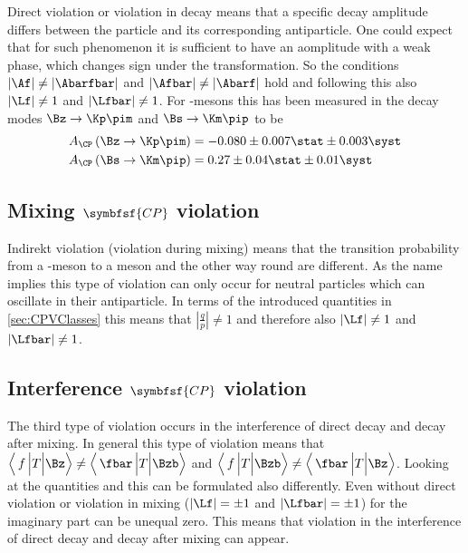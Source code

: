 Direct \CP violation or \CP violation in decay means that a specific decay amplitude differs between the particle and  its
corresponding antiparticle. One could expect that for such phenomenon it is sufficient to have an aomplitude with a weak phase,
which changes sign under the \CP transformation. So the conditions $\left|\Af\right|\neq\left|\Abarfbar\right|$ and
$\left|\Afbar\right|\neq\left|\Abarf\right|$ hold and following this also $\left|\Lf\right|\neq1$ and $\left|\Lfbar\right|\neq1$.
For \B-mesons this has been measured in the decay modes $\Bz\to\Kp\pim$ and $\Bs\to\Km\pip$ \cite{LHCb-PAPER-2013-018} to be
\begin{equation}
\begin{split}
A_{\CP}\left(\Bz\to\Kp\pim\right) &= -0.080\pm0.007\stat \pm 0.003\syst\\
A_{\CP}\left(\Bs\to\Km\pip\right) &= 0.27\pm0.04\stat \pm 0.01\syst
\end{split}
\end{equation}


\subsection[head={Mixing \CP violation},tocentry={Mixing \CP violation}]{Mixing $\symbfsf{C{}P}$ violation}
\label{sec:MixingCPV}

Indirekt \CP violation (\CP violation during mixing) means that the transition probability from a \Bz-meson to a \Bzb meson
and the other way round are different. As the name implies this type of \CP violation can only occur for neutral particles
which can oscillate in their antiparticle. In terms of the introduced quantities in \cref{sec:CPVClasses} this means that
$\left|\frac{q}{p}\right|\neq1$ and therefore also $\left|\Lf\right|\neq1$ and $\left|\Lfbar\right|\neq1$.

\subsection[head={Interference \CP violation},tocentry={Interference \CP violation}]{Interference $\symbfsf{C{}P}$ violation}
\label{sec:InterferenceCPV}

The third type of \CP violation occurs in the interference of direct decay and decay after mixing. In general this type of \CP
violation means that $\left<\,f\,\Big|T\Big|\Bz\right>\neq\left<\,\fbar\,\Big|T\Big|\Bzb\right>$ and
$\left<\,f\,\Big|T\Big|\Bzb\right>\neq\left<\,\fbar\,\Big|T\Big|\Bz\right>$. Looking at the quantities \Lf and \Lfbar this can
be formulated also differently. Even without direct \CP violation or \CP violation in mixing ($\left|\Lf\right|=\pm1$ and
$\left|\Lfbar\right|=\pm1$) for the imaginary part can be unequal zero. This means that \CP violation in the interference of
direct decay and decay after mixing can appear.

